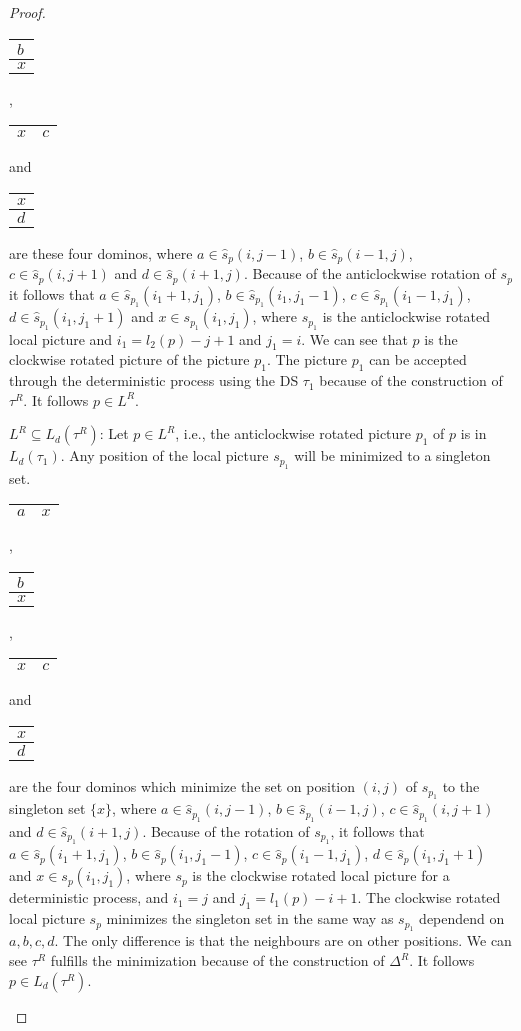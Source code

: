 \begin{proof}
\begin{compactitem}
\begin{tabular}{|C{0.6cm}|}
\hline 
$b$ \tabularnewline 
\hline 
$x$ \tabularnewline
\hline 
\end{tabular}, 
\begin{tabular}{|C{0.6cm}|C{0.6cm}|} 
\hline 
$x$ & $c$ \tabularnewline
\hline 
\end{tabular} and 
\begin{tabular}{|C{0.6cm}|} 
\hline 
$x$ \tabularnewline 
\hline 
$d$ \tabularnewline
\hline 
\end{tabular} are these four dominos, where $a \in \hat{s}_p(i, j - 1)$, $b \in \hat{s}_p(i - 1,
j)$, $c \in \hat{s}_p(i, j + 1)$ and $d \in \hat{s}_p(i + 1, j)$. Because of the anticlockwise rotation
of $s_p$ it follows that $a \in \hat{s}_{p_1}(i_1 + 1, j_1)$, $b \in \hat{s}_{p_1}(i_1, j_1 - 1)$,
$c \in \hat{s}_{p_1}(i_1 - 1, j_1)$, $d \in \hat{s}_{p_1}(i_1, j_1 + 1)$ and $x \in s_{p_1}(i_1,
j_1)$, where $s_{p_1}$ is the anticlockwise rotated local picture and $i_1 = l_2(p) - j + 1$ and
$j_1 = i$. We can see that $p$ is the clockwise rotated picture of the picture $p_1$. The picture
$p_1$ can be accepted through the deterministic process using the DS $\tau_1$ because of the
construction of $\tau^R$. It follows $p\in L^R$.
\item $L^R \subseteq L_d(\tau^R)$:\newline
Let $p \in L^R$, i.e., the anticlockwise rotated picture $p_1$ of $p$ is in $L_d(\tau_1)$. Any
position of the local picture $s_{p_1}$ will be minimized to a singleton set. 
\begin{tabular}{|C{0.6cm}|C{0.6cm}|} 
\hline 
$a$ & $x$ \tabularnewline
\hline 
\end{tabular}, 
\begin{tabular}{|C{0.6cm}|} 
\hline 
$b$ \tabularnewline 
\hline 
$x$ \tabularnewline
\hline 
\end{tabular}, 
\begin{tabular}{|C{0.6cm}|C{0.6cm}|} 
\hline 
$x$ & $c$ \tabularnewline
\hline 
\end{tabular} and 
\begin{tabular}{|C{0.6cm}|} 
\hline 
$x$ \tabularnewline 
\hline 
$d$ \tabularnewline
\hline 
\end{tabular} are the four dominos which minimize the set on position $(i, j)$ of $s_{p_1}$ to the
singleton set $\{x\}$, where $a \in \hat{s}_{p_1}(i, j - 1)$, $b \in \hat{s}_{p_1}(i - 1, j)$, $c
\in \hat{s}_{p_1}(i, j + 1)$ and $d \in \hat{s}_{p_1}(i + 1, j)$. Because of the rotation of
$s_{p_1}$, it follows that $a \in \hat{s}_{p}(i_1 + 1, j_1)$, $b \in \hat{s}_{p}(i_1, j_1 - 1)$, $c
\in \hat{s}_{p}(i_1 - 1, j_1)$, $d \in \hat{s}_{p}(i_1, j_1 + 1)$ and $x\in s_p(i_1, j_1)$, where
$s_{p}$ is the clockwise rotated local picture for a deterministic process, and $i_1 = j$ and $j_1 =
l_1(p) - i + 1$. The clockwise rotated local picture $s_p$ minimizes the singleton set in
the same way as $s_{p_1}$ dependend on $a, b, c, d$. The only difference is that the neighbours
are on other positions. We can see $\tau^R$ fulfills the minimization because of the construction
of $\Delta^R$. It follows $p\in L_d(\tau^R)$.
\end{compactitem}
\end{proof}
